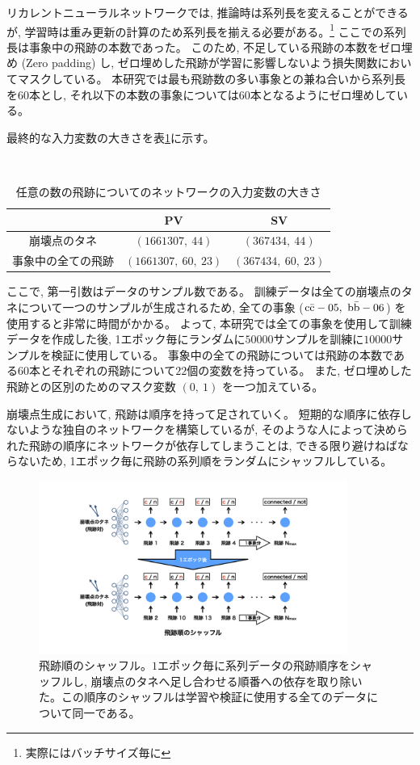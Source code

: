 リカレントニューラルネットワークでは, 推論時は系列長を変えることができるが, 学習時は重み更新の計算のため系列長を揃える必要がある。\footnote{実際にはバッチサイズ毎に}
ここでの系列長は事象中の飛跡の本数であった。
このため, 不足している飛跡の本数をゼロ埋め (Zero padding) し, ゼロ埋めした飛跡が学習に影響しないよう損失関数においてマスクしている。
本研究では最も飛跡数の多い事象との兼ね合いから系列長を$60$本とし, それ以下の本数の事象については$60$本となるようにゼロ埋めしている。

最終的な入力変数の大きさを表\ref{VLSTMInputParameterShape}に示す。

\begin{table}[htb]
 \centering
　\small
  \begin{tabular}{c | c c}\hline
    & PV & SV\\\hline
    崩壊点のタネ & $(1661307,\ 44)$ & $(367434,\ 44)$\\
    事象中の全ての飛跡 & $(1661307,\ 60,\ 23)$ & $(367434,\ 60,\ 23)$\\\hline
  \end{tabular}
  \caption{任意の数の飛跡についてのネットワークの入力変数の大きさ}
  \label{VLSTMInputParameterShape}
\end{table}

ここで, 第一引数はデータのサンプル数である。
訓練データは全ての崩壊点のタネについて一つのサンプルが生成されるため, 全ての事象 ($\rm c\bar{c}-05,\ \rm b\bar{b}-06$) を使用すると非常に時間がかかる。
よって, 本研究では全ての事象を使用して訓練データを作成した後, 1エポック毎にランダムに$50000$サンプルを訓練に$10000$サンプルを検証に使用している。
事象中の全ての飛跡については飛跡の本数である$60$本とそれぞれの飛跡について$22$個の変数を持っている。
また, ゼロ埋めした飛跡との区別のためのマスク変数 $(0,\ 1)$ を一つ加えている。

崩壊点生成において, 飛跡は順序を持って足されていく。
短期的な順序に依存しないような独自のネットワークを構築しているが, そのような人によって決められた飛跡の順序にネットワークが依存してしまうことは, できる限り避けねばならないため, 1エポック毎に飛跡の系列順をランダムにシャッフルしている。

\begin{figure}[htbp]
 \centering
 \includegraphics[trim = 150 100 150 100, width=0.9\textwidth, clip]{Figure/3Networks/3-4-2-1TrackShuffle.png}
 \caption[飛跡順のシャッフル]{飛跡順のシャッフル。$1$エポック毎に系列データの飛跡順序をシャッフルし, 崩壊点のタネへ足し合わせる順番への依存を取り除いた。この順序のシャッフルは学習や検証に使用する全てのデータについて同一である。}
 \label{3-4-2-1TrackShuffle}
\end{figure}

